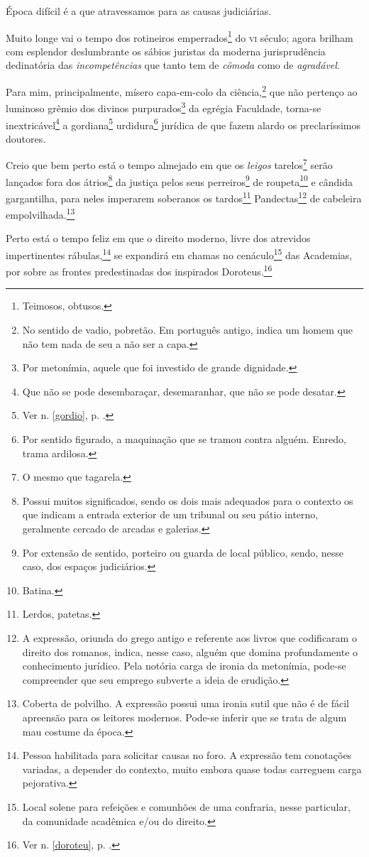 Época difícil é a que atravessamos para as causas judiciárias.

Muito longe vai o tempo dos rotineiros emperrados\footnote{Teimosos,
  obtusos.} do \textsc{vi} século; agora brilham com esplendor deslumbrante os
sábios juristas da moderna jurisprudência dedinatória das
\emph{incompetências} que tanto tem de \emph{cômoda} como de
\emph{agradável}.

Para mim, principalmente, mísero capa-em-colo da ciência,\footnote{No
  sentido de vadio, pobretão. Em português antigo, indica um homem que
  não tem nada de seu a não ser a capa.} que não pertenço ao luminoso
grêmio dos divinos purpurados\footnote{Por metonímia, aquele que foi
  investido de grande dignidade.} da egrégia Faculdade, torna-se
inextricável\footnote{Que não se pode desembaraçar, desemaranhar, que
  não se pode desatar.} a gordiana\footnote{Ver n. \ref{gordio}, p. \pageref{gordio}.}
urdidura\footnote{Por sentido figurado, a maquinação que se tramou
  contra alguém. Enredo, trama ardilosa.} jurídica de que fazem alardo
os preclaríssimos doutores.

Creio que bem perto está o tempo almejado em que os \emph{leigos}
tarelos\footnote{O mesmo que tagarela.} serão lançados fora dos
átrios\footnote{Possui muitos significados, sendo os dois mais
  adequados para o contexto os que indicam a entrada exterior de um
  tribunal ou seu pátio interno, geralmente cercado de arcadas e
  galerias.} da justiça pelos seus perreiros\footnote{Por extensão de
  sentido, porteiro ou guarda de local público, sendo, nesse caso, dos
  espaços judiciários.} de roupeta\footnote{Batina.} e cândida
gargantilha, para neles imperarem soberanos os tardos\footnote{Lerdos,
  patetas.} Pandectas\footnote{A expressão, oriunda do grego antigo e
  referente aos livros que codificaram o direito dos romanos, indica,
  nesse caso, alguém que domina profundamente o conhecimento jurídico.
  Pela notória carga de ironia da metonímia, pode-se compreender que seu
  emprego subverte a ideia de erudição.} de cabeleira
empolvilhada.\footnote{Coberta de polvilho. A expressão possui uma
  ironia sutil que não é de fácil apreensão para os leitores modernos.
  Pode-se inferir que se trata de algum mau costume da época.}

Perto está o tempo feliz em que o direito moderno, livre dos atrevidos
impertinentes rábulas,\footnote{Pessoa habilitada para solicitar causas
  no foro. A expressão tem conotações variadas, a depender do contexto,
  muito embora quase todas carreguem carga pejorativa.} se expandirá em
chamas no cenáculo\footnote{Local solene para refeições e comunhões de
  uma confraria, nesse particular, da comunidade acadêmica e/ou do
  direito.} das Academias, por sobre as frontes predestinadas dos
inspirados Doroteus.\footnote{Ver n. \ref{doroteu}, p. \pageref{doroteu}.}

